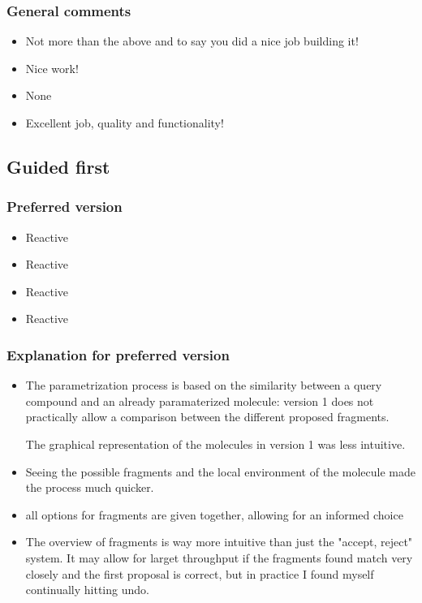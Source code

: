 \subsubsection{General comments}
\begin{itemize}
\item Not more than the above and to say you did a nice job building it!

\item Nice work!

\item None

\item Excellent job, quality and functionality!

\end{itemize}


\subsection{Guided first}
\subsubsection{Preferred version}
\begin{itemize}
\item Reactive

\item Reactive

\item Reactive

\item Reactive

\end{itemize}


\subsubsection{Explanation for preferred version}
\begin{itemize}
\item The parametrization process is based on the similarity between a query compound and an already paramaterized molecule: version 1 does not practically allow a comparison between the different proposed fragments.

The graphical representation of the molecules in version 1 was less intuitive.

\item Seeing the possible fragments and the local environment of the molecule made the process much quicker. 

\item all options for fragments are given together, allowing for an informed choice

\item The overview of fragments is way more intuitive than just the "accept, reject" system. It may allow for larget throughput if the fragments found match very closely and the first proposal is correct, but in practice I found myself continually hitting undo.

\end{itemize}


